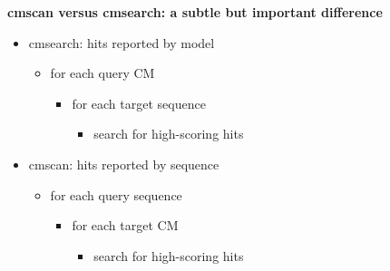 \documentclass[landscape]{slides}
\begin{document}
\begin{slide}
\begin{center}
\textbf{cmscan versus cmsearch: a subtle but important difference}
\end{center}

\small
\begin{itemize}
\item cmsearch: hits reported by model
  \begin{itemize}
  \item \textcolor{coloneoftwo}{for each query} \textcolor{coloneoftwo}{CM}
    \begin{itemize}
    \item \textcolor{coltwooftwo}{for each target} \textcolor{coltwooftwo}{sequence}
      \begin{itemize}
      \item search for high-scoring hits
      \end{itemize}
    \end{itemize}
  \end{itemize}
\end{itemize}

\begin{itemize}
\item cmscan: hits reported by sequence
  \begin{itemize}
  \item \textcolor{coltwooftwo}{for each query} \textcolor{coltwooftwo}{sequence}
    \begin{itemize}
    \item \textcolor{coloneoftwo}{for each target} \textcolor{coloneoftwo}{CM}
      \begin{itemize}
      \item search for high-scoring hits
      \end{itemize}
    \end{itemize}
  \end{itemize}
\end{itemize}

\vfill
\end{slide}
\end{document}
